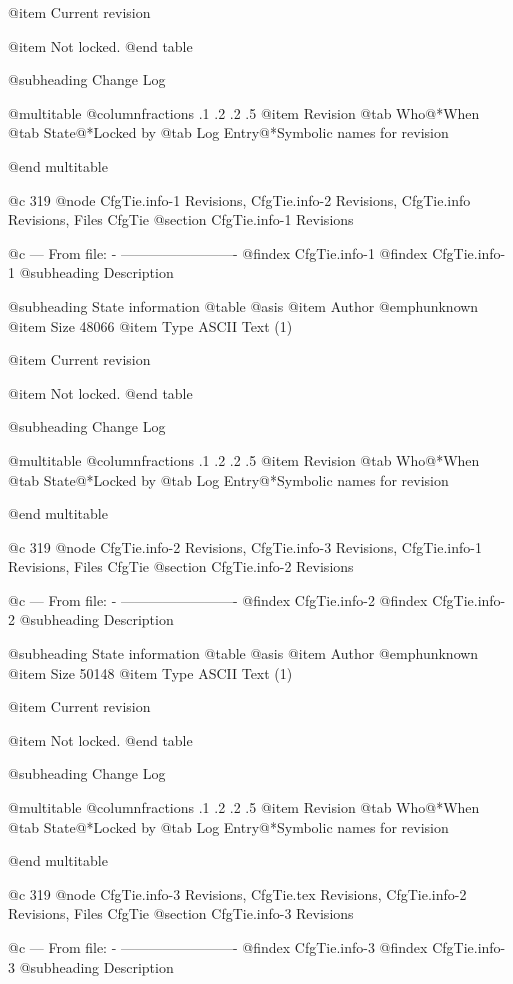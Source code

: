 @item Current revision

@item Not locked.
@end table

@subheading Change Log

@multitable @columnfractions .1 .2 .2 .5
@item Revision
@tab Who@*When
@tab State@*Locked by
@tab Log Entry@*Symbolic names for revision


@end multitable


@c 319
@node CfgTie.info-1 Revisions, CfgTie.info-2 Revisions, CfgTie.info Revisions, Files CfgTie
@section CfgTie.info-1 Revisions


@c --- From file: - -------------------------
@findex CfgTie.info-1
@findex CfgTie.info-1
@subheading Description


@subheading State information
@table @asis
@item Author
@emph{unknown}
@item Size
48066
@item Type
ASCII Text (1)

@item Current revision

@item Not locked.
@end table

@subheading Change Log

@multitable @columnfractions .1 .2 .2 .5
@item Revision
@tab Who@*When
@tab State@*Locked by
@tab Log Entry@*Symbolic names for revision


@end multitable


@c 319
@node CfgTie.info-2 Revisions, CfgTie.info-3 Revisions, CfgTie.info-1 Revisions, Files CfgTie
@section CfgTie.info-2 Revisions


@c --- From file: - -------------------------
@findex CfgTie.info-2
@findex CfgTie.info-2
@subheading Description


@subheading State information
@table @asis
@item Author
@emph{unknown}
@item Size
50148
@item Type
ASCII Text (1)

@item Current revision

@item Not locked.
@end table

@subheading Change Log

@multitable @columnfractions .1 .2 .2 .5
@item Revision
@tab Who@*When
@tab State@*Locked by
@tab Log Entry@*Symbolic names for revision


@end multitable


@c 319
@node CfgTie.info-3 Revisions, CfgTie.tex Revisions, CfgTie.info-2 Revisions, Files CfgTie
@section CfgTie.info-3 Revisions


@c --- From file: - -------------------------
@findex CfgTie.info-3
@findex CfgTie.info-3
@subheading Description


